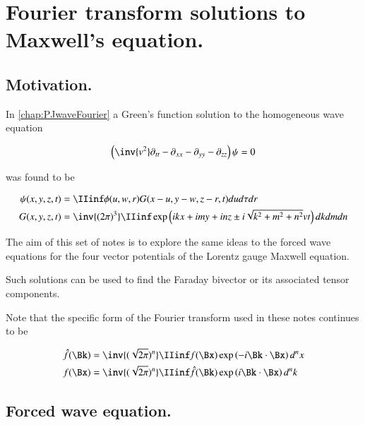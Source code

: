 \chapter{Fourier transform solutions to Maxwell's equation.}\label{chap:PJfourierMaxwellSecondOrder}
\date{ Jan 29, 2009.  $RCSfile: fourierMaxwell.tex,v $ Last $Revision: 1.21 $ $Date: 2009/06/11 16:45:58 $ }

\section{Motivation. }

In \ref{chap:PJwaveFourier} a Green's function solution to the homogeneous
wave equation

\begin{align}\label{eqn:fourier_maxwell:wave}
\left(\inv{v^2} \partial_{tt} -\partial_{xx} -\partial_{yy} -\partial_{zz} \right)\psi = 0
\end{align}

was found to be

\begin{align}\label{eqn:fourier_maxwell:greensSolution3d}
{\psi}(x,y,z,t) &= \IIinf \phi(u,w,r) G( x-u, y-w, z-r, t) du d\tau dr \\
G(x,y,z,t) &= \inv{({2\pi})^3} \IIinf \exp\left( i k x + i m y + i n z \pm i \sqrt{k^2 + m^2 + n^2} v t \right) dk dm dn
\end{align}

The aim of this set of notes is to explore the same ideas to the forced wave
equations for the four vector potentials of the Lorentz gauge Maxwell equation.

Such solutions can be used to find the Faraday bivector or its associated
tensor components.

Note that the specific form of the Fourier transform used in these notes continues to be

\begin{align}
\hat{f}(\Bk) &= \inv{(\sqrt{2\pi})^n} \IIinf f(\Bx) \exp\left( -i \Bk \cdot \Bx \right) d^n x \\
{f}(\Bx) &= \inv{(\sqrt{2\pi})^n} \IIinf \hat{f}(\Bk) \exp\left( i \Bk \cdot \Bx \right) d^n k
\end{align}

\section{Forced wave equation. }

